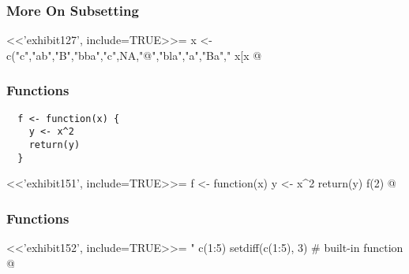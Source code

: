 \begin{frame}[fragile]%
\frametitle{More On Subsetting}
<<'exhibit127', include=TRUE>>=
  x <- c("c","ab","B","bba","c",NA,"@","bla","a","Ba","%
  x[x %
@
\end{frame}


\begin{frame}[fragile]
\frametitle{Functions}
\begin{lstlisting}
  f <- function(x) {
    y <- x^2
    return(y)
  }
\end{lstlisting}
<<'exhibit151', include=TRUE>>=
  f <- function(x) {
    y <- x^2
    return(y)
  }
  f(2)
@
\end{frame}


\begin{frame}[fragile]
\frametitle{Functions}
<<'exhibit152', include=TRUE>>=
  "%
  c(1:5) %
  setdiff(c(1:5), 3)  # built-in function
@
\end{frame}
